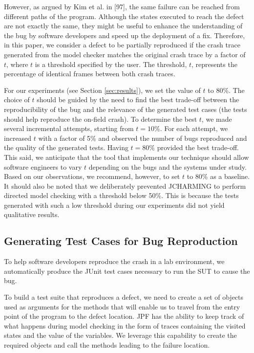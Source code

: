 \documentclass[12pt]{report}
\begin{document}
However, as argued by Kim et al. in {[}97{]}, the same failure can be
reached from different paths of the program. Although the states
executed to reach the defect are not exactly the same, they might be
useful to enhance the understanding of the bug by software developers
and speed up the deployment of a fix. Therefore, in this paper, we
consider a defect to be partially reproduced if the crash trace
generated from the model checker matches the original crash trace by a
factor of \(t\), where \(t\) is a threshold specified by the user. The
threshold, \(t\), represents the percentage of identical frames between
both crash traces.

For our experiments (see Section \ref{sec:results}), we set the value of
\(t\) to 80\%. The choice of \(t\) should be guided by the need to find
the best trade-off between the reproducibility of the bug and the
relevance of the generated test cases (the tests should help reproduce
the on-field crash). To determine the best \(t\), we made several
incremental attempts, starting from \(t = 10\%\). For each attempt, we
increased \(t\) with a factor of 5\% and observed the number of bugs
reproduced and the quality of the generated tests. Having \(t = 80\%\)
provided the best trade-off. This said, we anticipate that the tool that
implements our technique should allow software engineers to vary \(t\)
depending on the bugs and the systems under study. Based on our
observations, we recommend, however, to set \(t\) to 80\% as a baseline.
It should also be noted that we deliberately prevented JCHARMING to
perform directed model checking with a threshold below 50\%. This is
because the tests generated with such a low threshold during our
experiments did not yield qualitative results.

\subsection{\texorpdfstring{Generating Test Cases for Bug
Reproduction\label{sec:unit-tests}}{Generating Test Cases for Bug Reproduction}}\label{generating-test-cases-for-bug-reproduction}

To help software developers reproduce the crash in a lab environment, we
automatically produce the JUnit test cases necessary to run the SUT to
cause the bug.

To build a test suite that reproduces a defect, we need to create a set
of objects used as arguments for the methods that will enable us to
travel from the entry point of the program to the defect location. JPF
has the ability to keep track of what happens during model checking in
the form of traces containing the visited states and the value of the
variables. We leverage this capability to create the required objects
and call the methods leading to the failure location.
\end{document}
